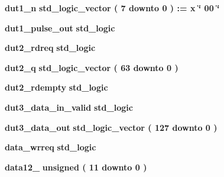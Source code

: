 \begin{DoxyCompactItemize}
{\bf dut1\+\_\+n} {\bfseries \textcolor{comment}{std\+\_\+logic\+\_\+vector}\textcolor{vhdlchar}{ }\textcolor{vhdlchar}{(}\textcolor{vhdlchar}{ }\textcolor{vhdlchar}{ } \textcolor{vhdldigit}{7} \textcolor{vhdlchar}{ }\textcolor{keywordflow}{downto}\textcolor{vhdlchar}{ }\textcolor{vhdlchar}{ } \textcolor{vhdldigit}{0} \textcolor{vhdlchar}{ }\textcolor{vhdlchar}{)}\textcolor{vhdlchar}{ }\textcolor{vhdlchar}{ }\textcolor{vhdlchar}{ }\textcolor{vhdlchar}{\+:}\textcolor{vhdlchar}{=}\textcolor{vhdlchar}{ }\textcolor{vhdlchar}{ }\textcolor{vhdlchar}{x}\textcolor{vhdlchar}{ }\textcolor{keyword}{\char`\"{} 00 \char`\"{}}\textcolor{vhdlchar}{ }} 
\item 
{\bf dut1\+\_\+pulse\+\_\+out} {\bfseries \textcolor{comment}{std\+\_\+logic}\textcolor{vhdlchar}{ }} 
\item 
{\bf dut2\+\_\+rdreq} {\bfseries \textcolor{comment}{std\+\_\+logic}\textcolor{vhdlchar}{ }} 
\item 
{\bf dut2\+\_\+q} {\bfseries \textcolor{comment}{std\+\_\+logic\+\_\+vector}\textcolor{vhdlchar}{ }\textcolor{vhdlchar}{(}\textcolor{vhdlchar}{ }\textcolor{vhdlchar}{ } \textcolor{vhdldigit}{63} \textcolor{vhdlchar}{ }\textcolor{keywordflow}{downto}\textcolor{vhdlchar}{ }\textcolor{vhdlchar}{ } \textcolor{vhdldigit}{0} \textcolor{vhdlchar}{ }\textcolor{vhdlchar}{)}\textcolor{vhdlchar}{ }} 
\item 
{\bf dut2\+\_\+rdempty} {\bfseries \textcolor{comment}{std\+\_\+logic}\textcolor{vhdlchar}{ }} 
\item 
{\bf dut3\+\_\+data\+\_\+in\+\_\+valid} {\bfseries \textcolor{comment}{std\+\_\+logic}\textcolor{vhdlchar}{ }} 
\item 
{\bf dut3\+\_\+data\+\_\+out} {\bfseries \textcolor{comment}{std\+\_\+logic\+\_\+vector}\textcolor{vhdlchar}{ }\textcolor{vhdlchar}{(}\textcolor{vhdlchar}{ }\textcolor{vhdlchar}{ } \textcolor{vhdldigit}{127} \textcolor{vhdlchar}{ }\textcolor{keywordflow}{downto}\textcolor{vhdlchar}{ }\textcolor{vhdlchar}{ } \textcolor{vhdldigit}{0} \textcolor{vhdlchar}{ }\textcolor{vhdlchar}{)}\textcolor{vhdlchar}{ }} 
\item 
{\bf data\+\_\+wrreq} {\bfseries \textcolor{comment}{std\+\_\+logic}\textcolor{vhdlchar}{ }} 
\item 
{\bf data12\+\_} {\bfseries \textcolor{comment}{unsigned}\textcolor{vhdlchar}{ }\textcolor{vhdlchar}{(}\textcolor{vhdlchar}{ }\textcolor{vhdlchar}{ } \textcolor{vhdldigit}{11} \textcolor{vhdlchar}{ }\textcolor{keywordflow}{downto}\textcolor{vhdlchar}{ }\textcolor{vhdlchar}{ } \textcolor{vhdldigit}{0} \textcolor{vhdlchar}{ }\textcolor{vhdlchar}{)}\textcolor{vhdlchar}{ }} 

\end{DoxyCompactItemize}

